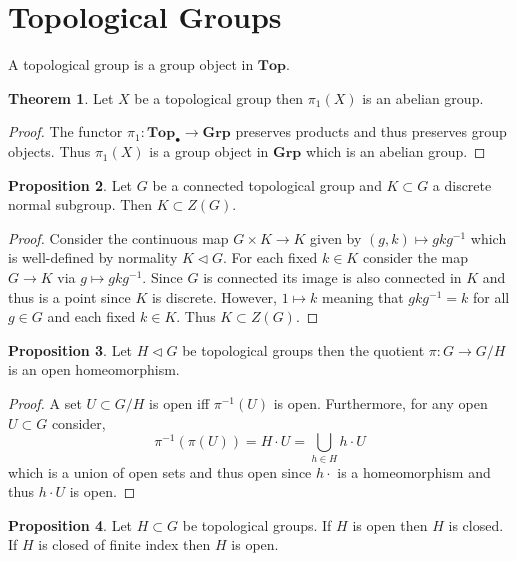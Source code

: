 \documentclass[12pt]{article}
\newcommand{\Top}{\mathbf{Top}}
\newcommand{\pTop}{\mathbf{Top}_\bullet}
\newcommand{\Grp}{\mathbf{Grp}}
\theoremstyle{remark}
\theoremstyle{definition}
\newtheorem{theorem}{Theorem}[section]
\newtheorem{proposition}[theorem]{Proposition}
\newenvironment{definition}[1][Definition:]{\begin{trivlist}
\item[\hskip \labelsep {\bfseries #1}]}{\end{trivlist}}
\begin{document}
\section{Topological Groups}

\begin{definition}
A topological group is a group object in $\Top$. 
\end{definition}

\begin{theorem}
Let $X$ be a topological group then $\pi_1(X)$ is an abelian group.
\end{theorem}

\begin{proof}
The functor $\pi_1 : \pTop \to \Grp$ preserves products and thus preserves group objects. Thus $\pi_1(X)$ is a group object in $\Grp$ which is an abelian group. 
\end{proof}


\begin{proposition} \label{discrete_in_center}
Let $G$ be a connected topological group and $K \subset G$ a discrete normal subgroup. Then $K \subset Z(G)$. 
\end{proposition}

\begin{proof}
Consider the continuous map $G \times K \to K$ given by $(g, k) \mapsto g k g^{-1}$ which is well-defined by normality $K \triangleleft G$. For each fixed $k \in K$ consider the map $G \to K$ via $g \mapsto g k g^{-1}$. Since $G$ is connected its image is also connected in $K$ and thus is a point since $K$ is discrete. However, $1 \mapsto k$ meaning that $g k g^{-1} = k$ for all $g \in G$ and each fixed $k \in K$. Thus $K \subset Z(G)$. 
\end{proof}

\begin{proposition}
Let $H \triangleleft G$ be topological groups then the quotient $\pi : G \to G / H$ is an open homeomorphism.
\end{proposition}

\begin{proof}
A set $U \subset G / H$ is open iff $\pi^{-1}(U)$ is open. Furthermore, for any open $U \subset G$ consider,
\[ \pi^{-1}(\pi(U)) = H \cdot U = \bigcup_{h \in H} h \cdot U \]
which is a union of open sets and thus open since $h \cdot$ is a homeomorphism and thus $h \cdot U$ is open.
\end{proof}

\begin{proposition}
Let $H \subset G$ be topological groups. If $H$ is open then $H$ is closed. If $H$ is closed of finite index then $H$ is open.
\end{proposition}
\end{document}
